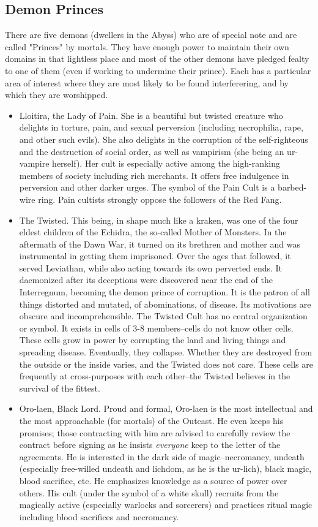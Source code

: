 \subsection{Demon Princes}
There are five demons (dwellers in the Abyss) who are of special note and are called "Princes" by mortals. They have enough power to maintain their own domains in that lightless place and most of the other demons have pledged fealty to one of them (even if working to undermine their prince). Each has a particular area of interest where they are most likely to be found interferering, and by which they are worshipped.
\begin{itemize}
	\item Lloitira, the Lady of Pain. She is a beautiful but twisted creature who delights in torture, pain, and sexual perversion (including necrophilia, rape, and other such evils). She also delights in the corruption of the self-righteous and the destruction of social order, as well as vampirism (she being an ur-vampire herself). Her cult is especially active among the high-ranking members of society including rich merchants. It offers free indulgence in perversion and other darker urges. The symbol of the Pain Cult is a barbed-wire ring. Pain cultists strongly oppose the followers of the Red Fang.
	\item The Twisted. This being, in shape much like a kraken, was one of the four eldest children of the Echidra, the so-called Mother of Monsters. In the aftermath of the Dawn War, it turned on its brethren and mother and was instrumental in getting them imprisoned. Over the ages that followed, it served Leviathan, while also acting towards its own perverted ends. It daemonized after its deceptions were discovered near the end of the Interregnum, becoming the demon prince of corruption. It is the patron of all things distorted and mutated, of abominations, of disease. Its motivations are obscure and incomprehensible. The Twisted Cult has no central organization or symbol. It exists in cells of 3-8 members--cells do not know other cells. These cells grow in power by corrupting the land and living things and spreading disease. Eventually, they collapse. Whether they are destroyed from the outside or the inside varies, and the Twisted does not care. These cells are frequently at cross-purposes with each other--the Twisted believes in the survival of the fittest.
	\item Oro-laen, Black Lord. Proud and formal, Oro-laen is the most intellectual and the most approachable (for mortals) of the Outcast. He even keeps his promises; those contracting with him are advised to carefully review the contract before signing as he insists \textit{everyone} keep to the letter of the agreements. He is interested in the dark side of magic--necromancy, undeath (especially free-willed undeath and lichdom, as he is the ur-lich), black magic, blood sacrifice, etc. He emphasizes knowledge as a source of power over others. His cult (under the symbol of a white skull) recruits from the magically active (especially warlocks and sorcerers) and practices ritual magic including blood sacrifices and necromancy.

\end{itemize}
